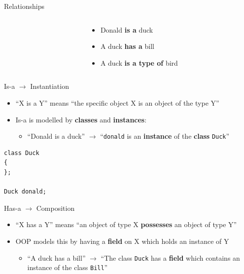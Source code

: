\begin{frame}{Relationships}
\begin{columns}
\begin{column}{0.3\textwidth}
		\end{column}
		\begin{column}{0.66\textwidth}
			\begin{itemize}
				\pause\item Donald \textbf{is a} duck
				\pause\item A duck \textbf{has a} bill
				\pause\item A duck \textbf{is a type of} bird
			\end{itemize}
		\end{column}
	\end{columns}
\end{frame}

\begin{frame}[fragile]{Is-a $\to$ Instantiation}
	\begin{itemize}
		\pause\item ``X is a Y'' means ``the specific object X is an object of the type Y''
		\pause\item Is-a is modelled by \textbf{classes} and \textbf{instances}:
		\begin{itemize}
			\pause\item ``Donald is a duck'' 
				$\to$ ``\lstinline{donald} is an \textbf{instance} of the \textbf{class} \lstinline{Duck}''
		\end{itemize}
	\end{itemize}
	\pause
	\begin{lstlisting}
class Duck
{
};

Duck donald;
	\end{lstlisting}
\end{frame}

\begin{frame}{Has-a $\to$ Composition}
	\begin{itemize}
		\pause\item ``X has a Y'' means ``an object of type X \textbf{possesses} an object of type Y''
		\pause\item OOP models this by having a \textbf{field} on X which holds an instance of Y
		\begin{itemize}
			\pause\item ``A duck has a bill''
				$\to$ ``The class \lstinline{Duck} has a \textbf{field} which contains an instance of the class \lstinline{Bill}''
		\end{itemize}
	\end{itemize}
\end{frame}

